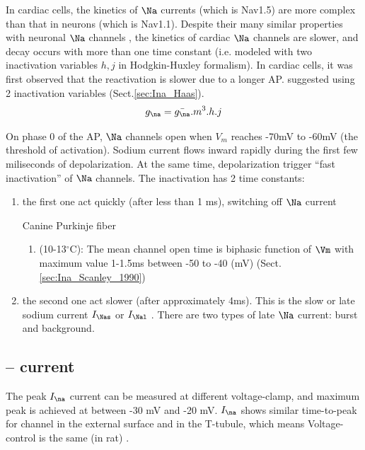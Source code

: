 In cardiac cells, the kinetics of $\Na$ currents (which is Nav1.5) are more
complex than that in neurons (which is Nav1.1). Despite their many similar
properties with neuronal $\Na$ channels \citep{cachelin1983, Scanley1990}, the
kinetics of cardiac $\Na$ channels are slower, and decay occurs with more than
one time constant (i.e.
modeled with two inactivation variables $h, j$ in Hodgkin-Huxley formalism).
In cardiac cells, it was first observed that the reactivation is slower due to a
longer AP. \citep{haas1971} suggested using 2 inactivation variables
(Sect.\ref{sec:Ina_Haas}).
\begin{equation}
g_\na  = \bar{g_\na}.m^3.h.j
\end{equation}

On phase 0 of the AP, $\Na$ channels open when $V_m$ reaches
-70mV to -60mV (the threshold of activation). Sodium current flows inward
rapidly during the first few miliseconds of depolarization. At the same time,
depolarization trigger ``fast inactivation'' of $\Na$ channels. The inactivation
has 2 time constants:
\begin{enumerate}
  \item the first one act quickly (after less than 1 ms), switching off $\Na$
  current

Canine Purkinje fiber
\begin{enumerate}
  \item \citep{Scanley1990} (10-13$^\circ$C): The mean channel open time is
  biphasic function of $\Vm$ with maximum value 1-1.5ms between -50 to -40 (mV)
  (Sect.\ref{sec:Ina_Scanley_1990})
  
\end{enumerate}

  \item the second one act slower (after approximately 4ms). This is the slow or
  late sodium current $I_\Nas$ or $I_\Nal$ \citep{undrovinas2002}. There are two
  types of late $\Na$ current: burst and background\citep{zilberter1994}. 
\end{enumerate}

\subsection{-- current}


The peak $I_\na$ current can be measured at different voltage-clamp, and maximum
peak is achieved at between -30 mV and -20 mV. $I_\na$ shows similar
time-to-peak for channel in the external surface and in the T-tubule, which
means Voltage-control is the same (in rat) \citep{brette2006}.

